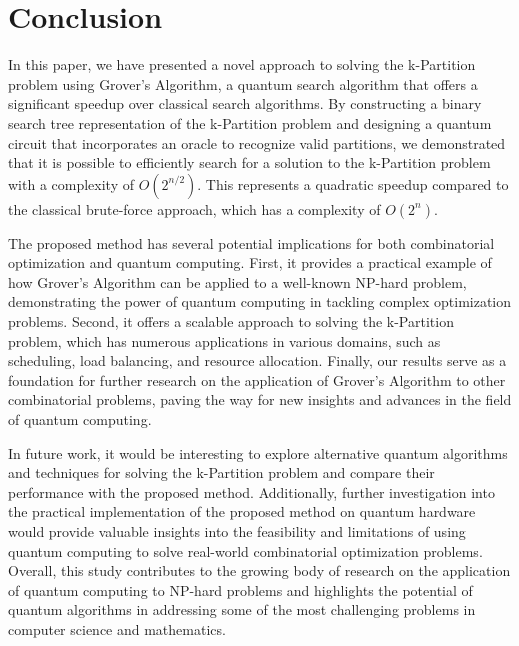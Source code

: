 \section{Conclusion}

In this paper, we have presented a novel approach to solving the k-Partition problem using Grover's Algorithm, a quantum search algorithm that offers a significant speedup over classical search algorithms. By constructing a binary search tree representation of the k-Partition problem and designing a quantum circuit that incorporates an oracle to recognize valid partitions, we demonstrated that it is possible to efficiently search for a solution to the k-Partition problem with a complexity of $O(2^{n/2})$. This represents a quadratic speedup compared to the classical brute-force approach, which has a complexity of $O(2^n)$.

The proposed method has several potential implications for both combinatorial optimization and quantum computing. First, it provides a practical example of how Grover's Algorithm can be applied to a well-known NP-hard problem, demonstrating the power of quantum computing in tackling complex optimization problems. Second, it offers a scalable approach to solving the k-Partition problem, which has numerous applications in various domains, such as scheduling, load balancing, and resource allocation. Finally, our results serve as a foundation for further research on the application of Grover's Algorithm to other combinatorial problems, paving the way for new insights and advances in the field of quantum computing.

In future work, it would be interesting to explore alternative quantum algorithms and techniques for solving the k-Partition problem and compare their performance with the proposed method. Additionally, further investigation into the practical implementation of the proposed method on quantum hardware would provide valuable insights into the feasibility and limitations of using quantum computing to solve real-world combinatorial optimization problems. Overall, this study contributes to the growing body of research on the application of quantum computing to NP-hard problems and highlights the potential of quantum algorithms in addressing some of the most challenging problems in computer science and mathematics.

